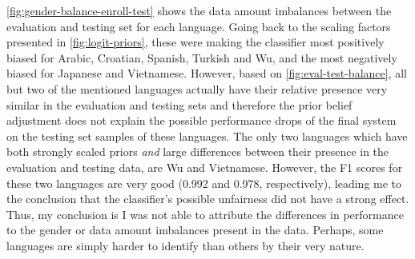 \documentclass[bsc,frontabs,twoside,singlespacing,parskip,deptreport]{infthesis}
\begin{document}
{{    %
    \autoref{fig:gender-balance-enroll-test} shows the data amount imbalances between the evaluation and testing set for each language. Going back to the scaling factors presented in \autoref{fig:logit-priors}, these were making the classifier most positively biased for Arabic, Croatian, Spanish, Turkish and Wu, and the most negatively biased for Japanese and Vietnamese. However, based on \autoref{fig:eval-test-balance}, all but two of the mentioned languages actually have their relative presence very similar in the evaluation and testing sets and therefore the prior belief adjustment does not explain the possible performance drops of the final system on the testing set samples of these languages. The only two languages which have both strongly scaled priors \textit{and} large differences between their presence in the evaluation and testing data, are Wu and Vietnamese. However, the F1 scores for these two languages are very good (0.992 and 0.978, respectively), leading me to the conclusion that the classifier's possible unfairness did not have a strong effect. Thus, my conclusion is I was not able to attribute the differences in performance to the gender or data amount imbalances present in the data. Perhaps, some languages are simply harder to identify than others by their very nature.

  }

}
\end{document}
